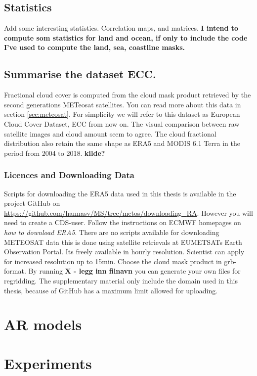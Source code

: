 \subsection{Statistics}
Add some interesting statistics. Correlation maps, and matrices.
\textbf{I intend to compute som statistics for land and ocean, if only to include the code I've used to compute the land, sea, coastline masks.}

\subsection{Summarise the dataset ECC.}
Fractional cloud cover is computed from the cloud mask product retrieved by the second generations METeosat satellites. You can read more about this data in section \ref{sec:meteosat}. For simplicity we will refer to this dataset as European Cloud Cover Dataset, ECC from now on. The visual comparison between raw satellite images and cloud amount seem to agree. The cloud fractional distribution also retain the same shape as ERA5 and MODIS 6.1 Terra in the period from 2004 to 2018. \textbf{kilde?}

\subsubsection{Licences and Downloading Data} \label{sec:downloading_data}
Scripts for downloading the ERA5 data used in this thesis is available in the project GitHub on \href{https://github.com/hannasv/MS/tree/metos/downloading{\_}RA}{https://github.com/hannasv/MS/tree/metos/downloading{\_}RA}. However you will need to create a CDS-user. Follow the instructions on ECMWF homepages on \textit{how to download ERA5}. There are no scripts available for downloading METEOSAT data this is done using satellite retrievals at EUMETSATs Earth Observation Portal. Its freely available in hourly resolution. Scientist can apply for increased resolution up to 15min. Choose the cloud mask product in grb-format. By running \textbf{X - legg inn filnavn} you can generate your own files for regridding. The supplementary material only include the domain used in this thesis, because of GitHub has a maximum limit allowed for uploading. 

\section{AR models}

\section{Experiments}






